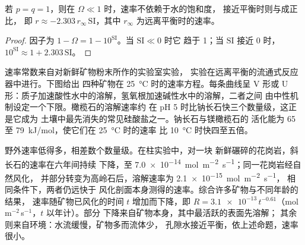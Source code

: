 \begin{proposition}[远离平衡与接近平衡]\label{prop:b3:water-rock-interaction:affinity}
若 $p = q = 1$，则在 $\Omega \ll 1$ 时，速率不依赖于水的饱和度，
接近平衡时则与成正比，
即 $r \approx -2.303\,r_\infty\,\mathrm{SI}$，其中
$r_\infty$ 为远离平衡时的速率。
\end{proposition}

\begin{proof}
因子为 $1 - \Omega = 1 - 10^{\mathrm{SI}}$。当 $\mathrm{SI} \ll 0$ 时它
趋于 1；当 $\mathrm{SI}$ 接近 0 时，$10^{\mathrm{SI}} \approx 1 +
2.303\,\mathrm{SI}$。
\end{proof}

速率常数来自对新鲜矿物粉末所作的实验室实验，
实验在远离平衡的流通式反应器中进行。下图给出
四种矿物在 \qty{25}{\celsius} 时的速率方程。每条曲线呈
V 形或 U 形：质子加速酸性水中的溶解，氢氧根加速碱性水中的溶解，二者之间
由中性机制设定一个下限。橄榄石的溶解速率约
在 pH 5 时比钠长石快三个数量级，这正是它成为
土壤中最先消失的常见硅酸盐之一。钠长石与镁橄榄石的
活化能为 65 至 \qty{79}{kJ/mol}，使它们在 \qty{25}{\celsius} 时的速率
比 \qty{10}{\celsius} 时快四至五倍。

野外速率低得多，相差数个数量级。在柱实验中，对一块
新鲜碾碎的花岗岩，斜长石的速率在六年间持续
下降，至 \qty{7.0e-14}{mol.m^{-2}.s^{-1}}；同一花岗岩经自然风化，
并部分转变为高岭石后，溶解速率为 \qty{2.1e-15}{mol.m^{-2}.s^{-1}}，
相同条件下，两者仍远快于
风化剖面本身测得的速率。综合许多矿物与不同年龄的结果，
速率随矿物已风化的时间 $t$ 增加而下降，即 $R =
\num{3.1e-13}\,t^{-0.61}$（mol\,m$^{-2}$\,s$^{-1}$，$t$ 以年计）。部分
下降来自矿物本身，其中最活跃的表面先溶解；
其余则来自环境：水流缓慢，矿物多而流体少，
孔隙水接近平衡，依上述命题，速率
很小。

